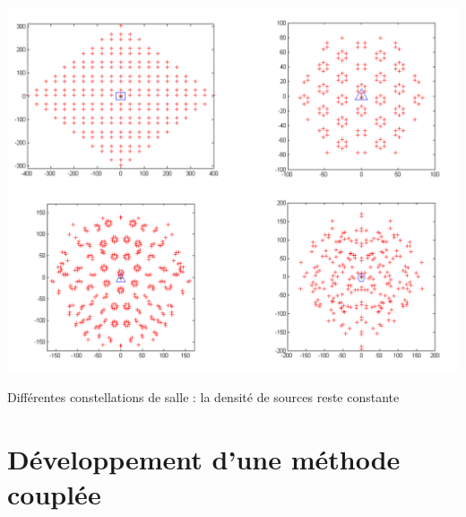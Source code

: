 \begin{figureth}
	\includegraphics[width=\linewidth]{images/constellations}
	\caption[Différentes constellations de salle : la densité de sources reste constante]{Différentes constellations de salle : la densité de sources reste constante \footnotemark}
	\label{constellations}
\end{figureth}


		
		
		
		
		
		
		
		
		
		
		
		
		
\chapter{Développement d'une méthode couplée}
	\minitoc
	\newpage
	
